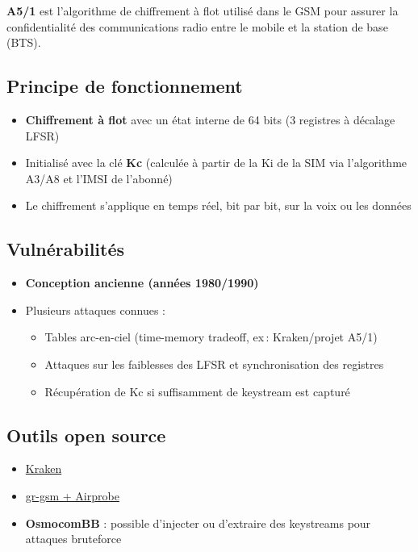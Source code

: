 \documentclass[
  french,
]{article}
\providecommand{\tightlist}{%
  \setlength{\itemsep}{0pt}\setlength{\parskip}{0pt}}
\begin{document}
\textbf{A5/1} est l'algorithme de chiffrement à flot utilisé dans le GSM
pour assurer la confidentialité des communications radio entre le mobile
et la station de base (BTS).

\subsection{Principe de
fonctionnement}\label{principe-de-fonctionnement}

\begin{itemize}
\tightlist
\item
  \textbf{Chiffrement à flot} avec un état interne de 64 bits (3
  registres à décalage LFSR)
\item
  Initialisé avec la clé \textbf{Kc} (calculée à partir de la Ki de la
  SIM via l'algorithme A3/A8 et l'IMSI de l'abonné)
\item
  Le chiffrement s'applique en temps réel, bit par bit, sur la voix ou
  les données
\end{itemize}

\subsection{Vulnérabilités}\label{vulnuxe9rabilituxe9s}

\begin{itemize}
\tightlist
\item
  \textbf{Conception ancienne (années 1980/1990)}
\item
  Plusieurs attaques connues :

  \begin{itemize}
  \tightlist
  \item
    Tables arc-en-ciel (time-memory tradeoff, ex\,: Kraken/projet A5/1)
  \item
    Attaques sur les faiblesses des LFSR et synchronisation des
    registres
  \item
    Récupération de Kc si suffisamment de keystream est capturé
  \end{itemize}
\end{itemize}

\subsection{Outils open source}\label{outils-open-source}

\begin{itemize}
\tightlist
\item
  \href{https://opensource.srlabs.de/projects/a51-decrypt}{Kraken}
\item
  \href{https://github.com/ptrkrysik/gr-gsm}{gr-gsm + Airprobe}
\item
  \textbf{OsmocomBB} : possible d'injecter ou d'extraire des keystreams
  pour attaques bruteforce
\end{itemize}
\end{document}

